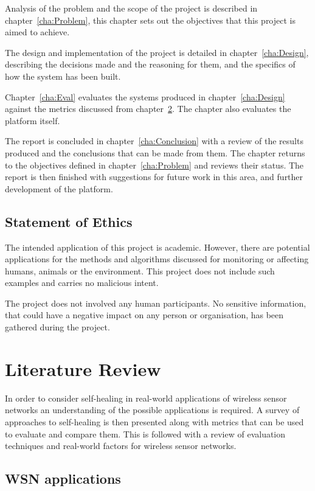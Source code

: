 \documentclass[authoryearcitations]{UoYCSproject}
\begin{document}
Analysis of the problem and the scope of the project is described in chapter~\ref{cha:Problem}, this chapter sets out the objectives that this project is aimed to achieve.

The design and implementation of the project is detailed in chapter~\ref{cha:Design}, describing the decisions made and the reasoning for them, and the specifics of how the system has been built.

Chapter~\ref{cha:Eval} evaluates the systems produced in chapter~\ref{cha:Design} against the metrics discussed from chapter~\ref{cha:LitReview}. The chapter also evaluates the platform itself.

The report is concluded in chapter~\ref{cha:Conclusion} with a review of the results produced and the conclusions that can be made from them. The chapter returns to the objectives defined in chapter~\ref{cha:Problem} and reviews their status. The report is then finished with suggestions for future work in this area, and further development of the platform.

\section{Statement of Ethics}

The intended application of this project is academic. However, there are potential applications for the methods and algorithms discussed for monitoring or affecting humans, animals or the environment. This project does not include such examples and carries no malicious intent.

The project does not involved any human participants. No sensitive information, that could have a negative impact on any person or organisation, has been gathered during the project.

\chapter{Literature Review}
\label{cha:LitReview}


In order to consider self-healing in real-world applications of wireless sensor networks an understanding of the possible applications is required. A survey of approaches to self-healing is then presented along with metrics that can be used to evaluate and compare them. This is followed with a review of evaluation techniques and real-world factors for wireless sensor networks.

\section{WSN applications}
\end{document}
